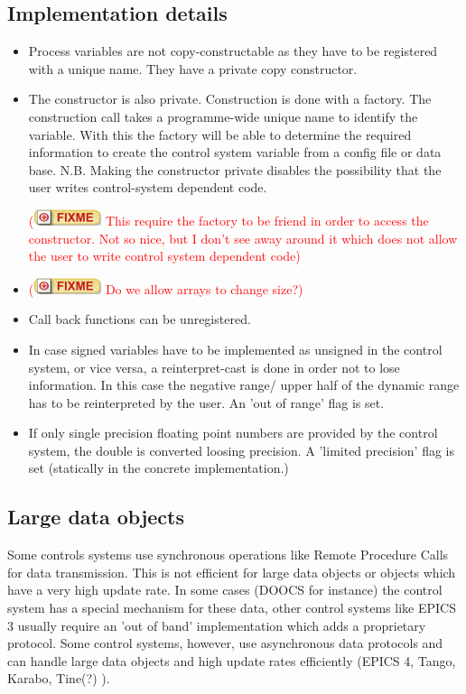 \documentclass[11pt,a4paper]{scrartcl}
\newcounter{nFixmes}
\newcommand{\fixme}[1]{\addtocounter{nFixmes}{1}\textcolor{red}{(\includegraphics[height=2ex]{fixme} #1)}\xspace}
\begin{document}
\subsection{Implementation details}

\begin{itemize}
\item Process variables are not copy-constructable as they have to be registered with a unique name. They have a private copy constructor.
\item The constructor is also private. Construction is done with a factory. The construction call takes a programme-wide unique name to identify the variable. With this the factory will be able to determine the required information to create the control system variable from a config file or data base.
N.B. Making the constructor private disables the possibility that the user writes control-system dependent code.
\fixme{This require the factory to be friend in order to access the constructor. Not so nice, but I don't see away around it which does not allow the user to write control system dependent code}
\item \fixme{Do we allow arrays to change size?}
\item Call back functions can be unregistered.
\item In case signed variables have to be implemented as unsigned in the control system, or vice versa, a reinterpret-cast is done in order not to lose information. In this case the negative range/ upper half of the dynamic range has to be reinterpreted by the user. An 'out of range' flag is set.
\item If only single precision floating point numbers are provided by the control system, the double is converted loosing precision. A 'limited precision' flag is set (statically in the concrete implementation.)
\end{itemize}

\subsection{Large data objects}

Some controls systems use synchronous operations like Remote Procedure Calls for data transmission. This is not efficient for large data objects or objects which have a very high update rate. In some cases (DOOCS for instance) the control system has a special mechanism for these data, other control systems like EPICS 3 usually require an 'out of band' implementation which adds a proprietary protocol. Some control systems, however, use asynchronous data protocols and can handle large data objects and high update rates efficiently (EPICS 4, Tango, Karabo, Tine(?) ).
\end{document}

